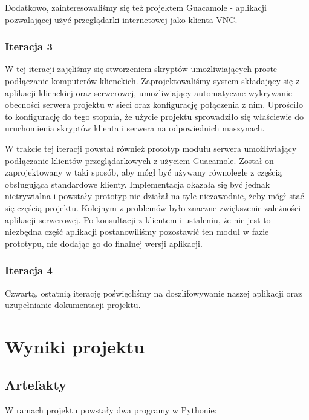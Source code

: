       Dodatkowo, zainteresowaliśmy się też projektem Guacamole \cite{Guacamole} - aplikacji pozwalającej użyć przeglądarki internetowej jako klienta VNC.

    \subsubsection{Iteracja 3}

      W tej iteracji zajęliśmy się stworzeniem skryptów umożliwiających proste podłączanie komputerów klienckich. Zaprojektowaliśmy system składający się z aplikacji klienckiej oraz serwerowej, umożliwiający automatyczne wykrywanie obecności serwera projektu w sieci oraz konfigurację połączenia z nim. Uprościło to konfigurację do tego stopnia, że użycie projektu sprowadziło się właściewie do uruchomienia skryptów klienta i serwera na odpowiednich maszynach.

    W trakcie tej iteracji powstał również prototyp modułu serwera umożliwiający podłączanie klientów przeglądarkowych z użyciem Guacamole. Został on zaprojektowany w taki sposób, aby mógł być używany równolegle z częścią obsługująca standardowe  klienty. Implementacja okazała się być jednak nietrywialna i powstały prototyp nie działał na tyle niezawodnie, żeby mógł stać się częścią projektu. Kolejnym z problemów było znaczne zwiększenie zależności aplikacji serwerowej. Po konsultacji z klientem i ustaleniu, że nie jest to niezbędna część aplikacji postanowiliśmy pozostawić ten moduł w fazie prototypu, nie dodając go do finalnej wersji aplikacji.

    \subsubsection{Iteracja 4}
      Czwartą, ostatnią iterację poświęcliśmy na doszlifowywanie naszej aplikacji oraz uzupełnianie dokumentacji projektu.

    \vfill

\section{Wyniki projektu}

  \subsection{Artefakty}

    W ramach projektu powstały dwa programy w Pythonie:

    \vspace{3mm}

